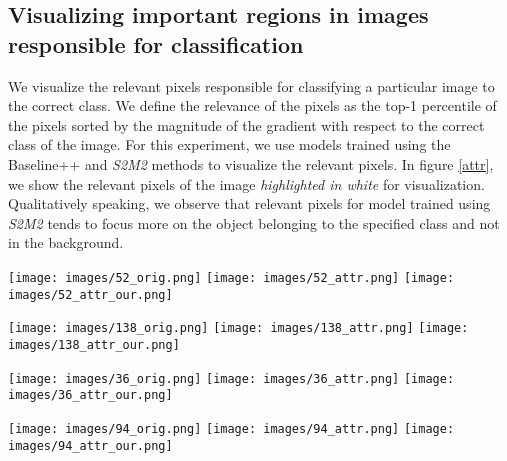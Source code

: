 \documentclass[10pt,twocolumn,letterpaper]{article}
\begin{document}
\subsection{Visualizing important regions in images responsible for classification}
We visualize the relevant pixels responsible for classifying a particular image to the correct class. We define the relevance of the pixels as the top-1 percentile of the pixels sorted by the magnitude of the gradient with respect to the correct class of the image. For this experiment, we use models trained using the Baseline++ \cite{chen2019closerfewshot} and \textit{S2M2} methods to visualize the relevant pixels. In figure \ref{attr}, we show the relevant pixels of the image \textit{highlighted in white} for visualization. Qualitatively speaking, we observe that relevant pixels for model trained using \textit{S2M2} tends to focus more on the object belonging to the specified class and not in the background.



\begin{minipage}{\textwidth}
\centering
    \texttt{[image: images/52\_orig.png]} \hspace{0.05cm}
    \texttt{[image: images/52\_attr.png]}
    \hspace{0.05cm}
    \texttt{[image: images/52\_attr\_our.png]}


    \texttt{[image: images/138\_orig.png]}
    \hspace{0.05cm}
    \texttt{[image: images/138\_attr.png]}
    \hspace{0.05cm}
    \texttt{[image: images/138\_attr\_our.png]}
    
    \texttt{[image: images/36\_orig.png]} \hspace{0.05cm}
    \texttt{[image: images/36\_attr.png]}
    \hspace{0.05cm}
    \texttt{[image: images/36\_attr\_our.png]}

    \texttt{[image: images/94\_orig.png]}
    \hspace{0.05cm}
    \texttt{[image: images/94\_attr.png]}
    \hspace{0.05cm}
    \texttt{[image: images/94\_attr\_our.png]}
    
    
    
    \label{attr}
\end{minipage}
\end{document}
